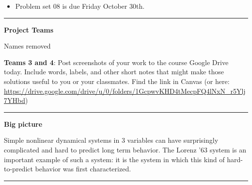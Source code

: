 \documentclass[12pt,letterpaper,noanswers]{exam}
\begin{document}
 \pdfpageheight 11in 
  \pdfpagewidth 8.5in

\noindent 




\begin{itemize}
\item Problem set 08 is due Friday October 30th.
\end{itemize}

\hrule
\vspace{0.2cm}



\noindent\textbf{Project Teams}

Names removed


\noindent \textbf{Teams 3 and 4}: Post screenshots of your work to the course Google Drive today.  Include words, labels, and other short notes that might make those solutions useful to you or your classmates.  Find the link in Canvas (or here: \url{https://drive.google.com/drive/u/0/folders/1GcpwvKHD4tMecpFQ4lNxN_r5Ylj7YHbd})


\vspace{0.2cm}

\hrule
\vspace{0.2cm}

\noindent\textbf{Big picture}

Simple nonlinear dynamical systems in 3 variables can have surprisingly complicated and hard to predict long term behavior.  The Lorenz '63 system is an important example of such a system: it is the system in which this kind of hard-to-predict behavior was first characterized.


\vspace{0.2cm}
\hrule
\vspace{0.2cm}
\end{document}
